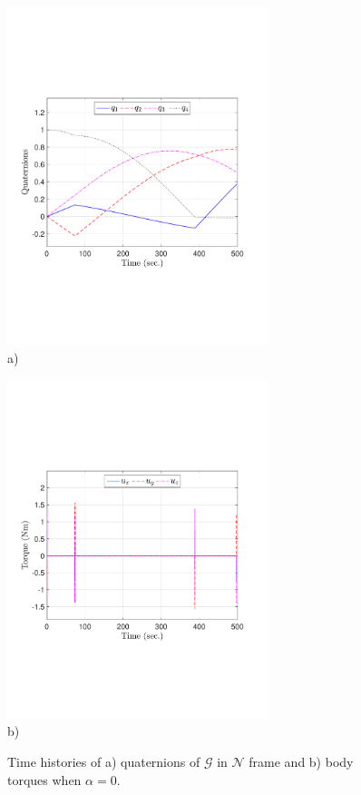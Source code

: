 \documentclass[journal ]{new-aiaa}
\begin{document}
\begin{figure}[htb!]
    \centering
    \begin{minipage}{.5\textwidth}
        \centering
\includegraphics[width=3in]{total_quaternions_alpha0}
		\\ a) 
    \end{minipage}%
    \begin{minipage}{0.5\textwidth}
        \centering
\includegraphics[width=3in]{total_torque_alpha0}
		\\ b) 
    \end{minipage}

    \caption{Time histories of a) quaternions of $\mathcal{G}$ in $\mathcal{N}$ frame and b) body torques when $\alpha=0$.}
    \label{fig:quats_phi_total0}
	\end{figure}
\end{document}
